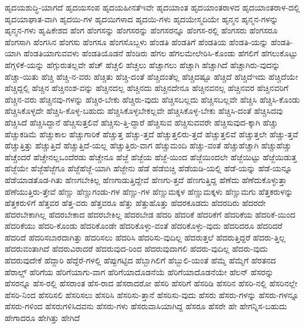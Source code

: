 {ಹೃದಯಶುದ್ಧಿ-ಯಾಗದೆ
ಹೃದಯಸಂಪ
ಹೃದಯಹೀನತೆಇವೇ
ಹೃದಯಾಂತ
ಹೃದಯಾಂತರಾಳದ
ಹೃದಯಾಂತರಾಳ-ದಲ್ಲಿ
ಹೃದಯಾಘಾತ-ವಾಗಿ
ಹೃದಯಿ-ಗಳ
ಹೃದಯಿಗಳಾದ
ಹೃದಯಿ-ಗಳು
ಹೃದಯೇಸ್ಮದಿಯೇ
ಹೃನ್ಮನ
ಹೃನ್ಮನ-ಗಳನ್ನು
ಹೃನ್ಮನ-ಗಳು
ಹೃಷಿಕೇಶದ
ಹೆಂಗ
ಹೆಂಗಸನ್ನು
ಹೆಂಗಸರನ್ನು
ಹೆಂಗಸರನ್ನೂ
ಹೆಂಗಸ-ರಲ್ಲಿ
ಹೆಂಗಸರು
ಹೆಂಗಸರೂ
ಹೆಂಗಸಾಗಿ
ಹೆಂಗಸಿನ
ಹೆಂಗಸು
ಹೆಂಗಸೂ
ಹೆಂಗಸೊಬ್ಬಳು
ಹೆಂಡತಿ
ಹೆಂಡತಿಗೆ
ಹೆಂಡತಿಯ
ಹೆಂಡತಿ-ಯನ್ನು
ಹೆಂಡತಿ-ಯಾಗಿ
ಹೆಂಡತಿಯಾಗುವವಳು
ಹೆಂಡತಿಯೊಡನೆ
ಹೆಂಡಿರು
ಹೆಗಲ
ಹೆಗಲಮೇಲೇರಿಸಿ-ಕೊಂಡು
ಹೆಗಲಿಗೆ
ಹೆಗಲುಕೊಟ್ಟು
ಹೆಗ್ಗಳಿಕೆ-ಯನ್ನು
ಹೆಗ್ಗುರುತಲ್ಲವೇ
ಹೆಚ್
ಹೆಚ್ಚಲಿ
ಹೆಚ್ಚಲು
ಹೆಚ್ಚಾಗಲು
ಹೆಚ್ಚಾಗಿ
ಹೆಚ್ಚಾಗಿದೆ
ಹೆಚ್ಚಾಗಿರು-ವುದನ್ನು
ಹೆಚ್ಚಾ-ಯಿತು
ಹೆಚ್ಚಿ
ಹೆಚ್ಚಿ-ನ-ವರು
ಹೆಚ್ಚಿತು
ಹೆಚ್ಚಿ-ದಂತೆ
ಹೆಚ್ಚಿದಂತೆಲ್ಲ
ಹೆಚ್ಚಿದಷ್ಟೂ
ಹೆಚ್ಚಿದೆ
ಹೆಚ್ಚಿದೆಇದು
ಹೆಚ್ಚಿದೆಯೇ
ಹೆಚ್ಚಿದ್ದಲ್ಲಿ
ಹೆಚ್ಚಿನ
ಹೆಚ್ಚಿನಂಶ-ವನ್ನು
ಹೆಚ್ಚಿನದಲ್ಲ
ಹೆಚ್ಚಿನದು
ಹೆಚ್ಚಿನದೇನೂ
ಹೆಚ್ಚಿನವನಲ್ಲ
ಹೆಚ್ಚಿನವರ
ಹೆಚ್ಚಿನವರಿಗೆ
ಹೆಚ್ಚಿನ-ವರು
ಹೆಚ್ಚಿನವು-ಗಳನ್ನು
ಹೆಚ್ಚಿರ-ಬೇಕು
ಹೆಚ್ಚಿರು-ವುದು
ಹೆಚ್ಚಿಸಬಲ್ಲದು
ಹೆಚ್ಚಿಸಬಲ್ಲವೇ
ಹೆಚ್ಚಿಸಿ
ಹೆಚ್ಚಿಸಿ-ಕೊಂಡು
ಹೆಚ್ಚಿಸಿಕೊಳ್ಳದೇ
ಹೆಚ್ಚಿಸಿ-ಕೊಳ್ಳ-ಬಹುದು
ಹೆಚ್ಚಿಸಿಕೊಳ್ಳಬೇಕಲ್ಲವೇ
ಹೆಚ್ಚಿಸಿಕೊಳ್ಳ-ಬೇಕು
ಹೆಚ್ಚಿಸಿ-ದಂತೆ
ಹೆಚ್ಚಿಸಿದವು
ಹೆಚ್ಚಿಸಿದೆ
ಹೆಚ್ಚಿಸಿದ್ದಾನೆ
ಹೆಚ್ಚಿಸುತ್ತಲಿವೆ
ಹೆಚ್ಚಿಸು-ತ್ತಿ-ದ್ದಾರೆ
ಹೆಚ್ಚಿಸುವ
ಹೆಚ್ಚಿಸುವವರೇ
ಹೆಚ್ಚಿಸುವುದ-ಕ್ಕಾಗಿ
ಹೆಚ್ಚು
ಹೆಚ್ಚುಕಡಿಮೆ
ಹೆಚ್ಚುಕಾಲ
ಹೆಚ್ಚುಗಾರಿಕೆ
ಹೆಚ್ಚುತ್ತ
ಹೆಚ್ಚು-ತ್ತದೆ
ಹೆಚ್ಚುತ್ತಲಿರು-ತ್ತದೆ
ಹೆಚ್ಚುತ್ತಲಿವೆ
ಹೆಚ್ಚುತ್ತಲೇ
ಹೆಚ್ಚು-ತ್ತವೆ
ಹೆಚ್ಚುತ್ತಿತ್ತು
ಹೆಚ್ಚುತ್ತಿದೆ
ಹೆಚ್ಚುತ್ತಿದೆ-ಯಲ್ಲ
ಹೆಚ್ಚುತ್ತಿರು-ವಾಗ
ಹೆಚ್ಚುಮಂದಿ
ಹೆಚ್ಚು-ವಂತೆ
ಹೆಚ್ಚುಹೆಚ್ಚಾಗಿ
ಹೆಚ್ಚುಹೆಚ್ಚು
ಹೆಚ್ಚೆಂದರೆ
ಹೆಚ್ಚೇನಲ್ಲಒಂದೆರಡು
ಹೆಚ್ಚೇನೂ
ಹೆಜ್ಜೆ
ಹೆಜ್ಜೆಯ
ಹೆಜ್ಜೆ-ಯಿಂದ
ಹೆಜ್ಜೆಯಿಂದಲೇ
ಹೆಜ್ಜೆಯಿಟ್ಟು
ಹೆಜ್ಜೆಯಿಡುತ್ತ
ಹೆಜ್ಜೆಯೇ
ಹೆಜ್ಜೆಹೆಜ್ಜೆಗೂ
ಹೆಜ್ಜೆಹೆಜ್ಜೆ-ಯಾಗಿ
ಹೆಜ್ಜೇನು
ಹೆಡೆ
ಹೆಡೆಬಿಚ್ಚಿ
ಹೆಡೆಯಡಿ-ಯಲ್ಲಿ
ಹೆಡೆ-ಯನ್ನು
ಹೆಡೆ-ಯನ್ನೂ
ಹೆಡೆಯಾಡತೊಡ-ಗಿತು
ಹೆಣಗಬೇಕಿಲ್ಲ
ಹೆಣಗಾಡುತ್ತಿದ್ದೇವೆ
ಹೆಣಗು-ತ್ತದೆ
ಹೆಣಗುತ್ತಿದ್ದ
ಹೆಣೆದು
ಹೆಣೆದುಕೊಳ್ಳುತ್ತಾ
ಹೆಣೆಯುತ್ತಿರು-ತ್ತೇವೆ
ಹೆಣ್ಣು
ಹೆಣ್ಣುಗಂಡು-ಗಳ
ಹೆಣ್ಣು-ಗಳ
ಹೆಣ್ಣುಮಕ್ಕಳ
ಹೆಣ್ಣುಮಕ್ಕಳು
ಹೆಣ್ಣುಮಗು
ಹೆತ್ತಕರುಳನ್ನು
ಹೆತ್ತಕರುಳಿಗೆ
ಹೆತ್ತವರ
ಹೆತ್ತ-ವರು
ಹೆತ್ತವರೂ
ಹೆತ್ತು
ಹೆತ್ತುಹೊತ್ತು
ಹೆದರಕೂಡದು
ಹೆದರದಿರು
ಹೆದರದೇ
ಹೆದರಬೇಕಾಗಿಲ್ಲ
ಹೆದರಬೇಕಾದ
ಹೆದರಬೇಕಿಲ್ಲ
ಹೆದರಬೇಡ
ಹೆದರಿ
ಹೆದರಿಕೆ
ಹೆದರಿಕೆಗೆ
ಹೆದರಿಕೆಯ
ಹೆದರಿಕೆ-ಯಿಂದ
ಹೆದರಿಕೆಯು
ಹೆದರಿ-ಕೊಂಡು
ಹೆದರಿಕೊಂಡೇ
ಹೆದರಿಕೊಳ್ಳು-ವಂತೆ
ಹೆದರಿಕೊಳ್ಳು-ವುದು
ಹೆದರಿದರೂ
ಹೆದರಿದರೆ
ಹೆದರಿದೆ
ಹೆದರಿಸಬಾರದಾಗಿತ್ತು
ಹೆದರಿಸಲು
ಹೆದರಿಸಿ
ಹೆದರಿಸು-ವುದಿಲ್ಲ
ಹೆದರುತ್ತಲೆ
ಹೆದರುತ್ತಿದ್ದರೆ
ಹೆದರು-ತ್ತಿಲ್ಲ
ಹೆದರುವಂತಾಗಿದೆ
ಹೆದರುವಿರಾದರೆ
ಹೆದರುವುದ-ರಿಂದ
ಹೆದರುವುದಾಗಲಿ
ಹೆದರು-ವುದಿಲ್ಲ
ಹೆದರು-ವುದು
ಹೆದರುವುದೇಕೆ
ಹೆದ್ದಾರಿ
ಹೆದ್ದೆರೆ-ಗಳಲ್ಲಿ
ಹೆಪ್ಪುಗಟ್ಟಿದ
ಹೆಬ್ಬಾಗಿಲಿಗೆ
ಹೆಬ್ಬುಲಿ-ಯಂತೆ
ಹೆಮ್ಮೆ
ಹೆಮ್ಮೆಗೆ
ಹೆರತನದ
ಹೆರಾಲ್ಡ್
ಹೆರಿಗೆಯ
ಹೆರಿಗೆಯಾಗು-ವಾಗ
ಹೆರಿಗೆಯಾದೊಡನೆಯೆ
ಹೆರಿಗೆಯಾದೊಡನೆಯೇ
ಹೆಲನ್
ಹೆಸರನ್ನು
ಹೆಸರನ್ನೂ
ಹೆಸ-ರಲ್ಲಿ
ಹೆಸರಾಂತ
ಹೆಸ-ರಾದ
ಹೆಸರಾದರೋ
ಹೆಸರಿ
ಹೆಸರಿಗೆ
ಹೆಸರಿಡಿ
ಹೆಸರಿನ
ಹೆಸರಿ-ನಲ್ಲಿ
ಹೆಸರಿನಲ್ಲೇ
ಹೆಸರಿ-ನಿಂದ
ಹೆಸರಿಸಲಿ
ಹೆಸರಿಸಲು
ಹೆಸರಿಸಿ
ಹೆಸರಿಸು-ತ್ತಾನೆ
ಹೆಸರಿಸು-ವುದು
ಹೆಸರು
ಹೆಸರು-ಗಳನ್ನು
ಹೆಸರು-ಗಳನ್ನೂ
ಹೆಸರು-ಗಳಿಂದ
ಹೆಸರುಗಳಿಸಿದವನು
ಹೆಸರು-ಗಳು
ಹೆಸರುವಾಸಿಯಾಗಿದ್ದ
ಹೆಸರೂ
ಹೆಸರೇ
ಹೇ
ಹೇಗನ್ನಿಸ-ಬಹುದು
ಹೇಗಾದರೂ
ಹೇಗಿತ್ತು
ಹೇಗಿದೆ
}
